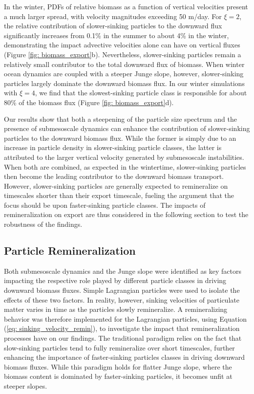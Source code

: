 \documentclass[article,linenumbers]{agujournal2018}
\begin{document}
In the winter, PDFs of relative biomass as a function of vertical velocities present a much larger spread, with velocity magnitudes exceeding 50 m/day. For $\xi = 2$, the relative contribution of slower-sinking particles to the downward flux significantly increases from 0.1\% in the summer to about 4\% in the winter, demonstrating the impact advective velocities alone can have on vertical fluxes (Figure \ref{fig: biomass_export}b). Nevertheless, slower-sinking particles remain a relatively small contributor to the total downward flux of biomass. When winter ocean dynamics are coupled with a steeper Junge slope, however, slower-sinking particles largely dominate the downward biomass flux. In our winter simulations with $\xi = 4$, we find that the slowest-sinking particle class is responsible for about 80\% of the biomass flux (Figure \ref{fig: biomass_export}d).

Our results show that both a steepening of the particle size spectrum and the presence of submesoscale dynamics can enhance the contribution of slower-sinking particles to the downward biomass flux. While the former is simply due to an increase in particle density in slower-sinking particle classes, the latter is attributed to the larger vertical velocity generated by submesoscale instabilities. When both are combined, as expected in the wintertime, slower-sinking particles then become the leading contributor to the downward biomass transport. However, slower-sinking particles are generally expected to remineralize on timescales shorter than their export timescale, fueling the argument that the focus should be upon faster-sinking particle classes. The impacts of remineralization on export are thus considered in the following section to test the robustness of the findings.

 \subsection{Particle Remineralization}
 \label{sec: results_remin}
 
 Both submesoscale dynamics and the Junge slope were identified as key factors impacting the respective role played by different particle classes in driving downward biomass fluxes. Simple Lagrangian particles were used to isolate the effects of these two factors. In reality, however, sinking velocities of particulate matter varies in time as the particles slowly remineralize. A remineralizing behavior was therefore implemented for the Lagrangian particles, using Equation (\ref{eq: sinking_velocity_remin}), to investigate the impact that remineralization processes have on our findings. The traditional paradigm relies on the fact that slow-sinking particles tend to fully remineralize over short timescales, further enhancing the importance of faster-sinking particles classes in driving downward biomass fluxes. While this paradigm holds for flatter Junge slope, where the biomass content is dominated by faster-sinking particles, it becomes unfit at steeper slopes. 
 
\end{document}
